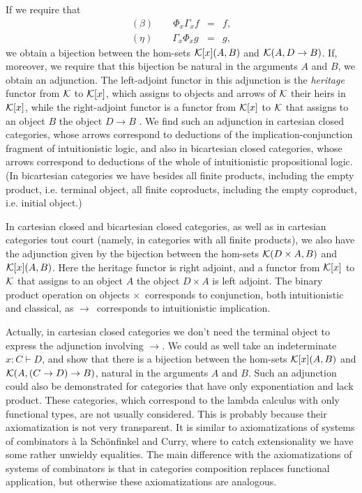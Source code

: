 \documentclass[12pt]{article}
\begin{document}
If we require that 
\begin{eqnarray*}
(\beta )\qquad \Phi _{x}\Gamma _{x}f &=&f, \\
(\eta )\qquad \Gamma _{x}\Phi _{x}g &=&g,
\end{eqnarray*}
we obtain a bijection between the hom-sets ${\cal K}[x](A,B)$ and ${\cal K}%
(A,D\rightarrow B)$. If, moreover, we require that this bijection be natural
in the arguments $A$ and $B$, we obtain an adjunction. The left-adjoint
functor in this adjunction is the {\it heritage} functor from ${\cal K}$ to $%
{\cal K}[x]$, which assigns to objects and arrows of ${\cal K}$ their heirs
in ${\cal K}[x]$, while the right-adjoint functor is a functor from ${\cal K}%
[x]$ to ${\cal K}$ that assigns to an object $B$ the object $D\rightarrow B$%
. We find such an adjunction in cartesian closed categories, whose arrows
correspond to deductions of the implication-conjunction fragment of
intuitionistic logic, and also in bicartesian closed categories, whose
arrows correspond to deductions of the whole of intuitionistic propositional
logic. (In bicartesian categories we have besides all finite products,
including the empty product, i.e. terminal object, all finite coproducts,
including the empty coproduct, i.e. initial object.)

In cartesian closed and bicartesian closed categories, as well as in
cartesian categories tout court (namely, in categories with all finite
products), we also have the adjunction given by the bijection between the
hom-sets ${\cal K}(D\times A,B)$ and ${\cal K}[x](A,B)$. Here the heritage
functor is right adjoint, and a functor from ${\cal K}[x]$ to ${\cal K}$
that assigns to an object $A$ the object $D\times A$ is left adjoint. The
binary product operation on objects $\times $\ corresponds to conjunction,
both intuitionistic and classical, as $\rightarrow $\ corresponds to
intuitionistic implication.

Actually, in cartesian closed categories we don't need the terminal object
to express the adjunction involving $\rightarrow $. We could as well take an
indeterminate $x:C\vdash D$, and show that there is a bijection between the
hom-sets ${\cal K}[x](A,B)$ and ${\cal K}(A,(C\rightarrow D)\rightarrow B)$,
natural in the arguments $A$ and $B$. Such an adjunction could also be
demonstrated for categories that have only exponentiation and lack product.
These categories, which correspond to the lambda calculus with only
functional types, are not usually considered. This is probably because their
axiomatization is not very transparent. It is similar to axiomatizations of
systems of combinators \`{a} la Sch\"{o}nfinkel and Curry, where to catch
extensionality we have some rather unwieldy equalities. The main difference
with the axiomatizations of systems of combinators is that in categories
composition replaces functional application, but otherwise these
axiomatizations are analogous.
\end{document}

